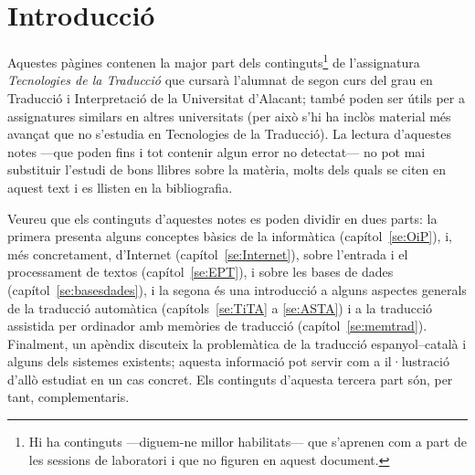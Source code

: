 \chapter{Introducció}

Aquestes pàgines contenen la major part dels continguts\footnote{Hi ha
  continguts ---diguem-ne millor habilitats--- que s'aprenen com a
  part de les sessions de laboratori i que no figuren en aquest
  document.} de l'assignatura \emph{Tecnologies de la Traducció} que
cursarà l'alumnat de segon curs del grau en Traducció i Interpretació
de la Universitat d'Alacant; també poden ser útils per a assignatures
similars en altres universitats (per això s'hi ha inclòs material més
avançat que no s'estudia en Tecnologies de la Traducció).  La lectura
d'aquestes notes ---que poden fins i tot contenir algun error no
detectat--- no pot mai substituir l'estudi de bons llibres sobre la
matèria, molts dels quals se citen en aquest text i es llisten en la
bibliografia.
  
Veureu que els continguts d'aquestes notes es poden dividir en dues
parts: la primera presenta alguns conceptes bàsics de la informàtica
(capítol~\ref{se:OiP}), i, més concretament, d'Internet
(capítol~\ref{se:Internet}), sobre l'entrada i el processament de
textos (capítol~\ref{se:EPT}), i sobre les bases de dades
(capítol~\ref{se:basesdades}), i la segona és una introducció a alguns
aspectes generals de la traducció automàtica (capítols~\ref{se:TiTA} a
\ref{se:ASTA}) i a la traducció assistida per ordinador amb memòries
de traducció (capítol~\ref{se:memtrad}). Finalment, un apèndix
discuteix la problemàtica de la traducció espanyol--català i alguns
dels sistemes existents; aquesta informació pot servir com a
il·lustració d'allò estudiat en un cas concret. Els continguts d'aquesta
tercera part són, per tant, complementaris.
  
